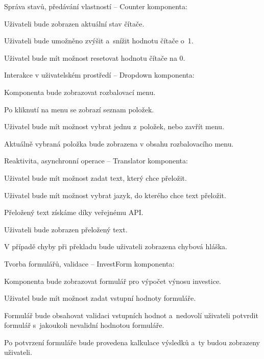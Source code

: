 \begin{citemize}
	\item Správa stavů, předávání vlastností -- Counter komponenta:
	
	\begin{cenumerate}
		\item Uživateli bude zobrazen aktuální stav čítače.
		\item Uživateli bude umožněno zvýšit a~snížit hodnotu čítače o~1.
		\item Uživatel bude mít možnost resetovat hodnotu čítače na 0.
	\end{cenumerate}

	\item Interakce v uživatelském prostředí -- Dropdown komponenta:
	
	\begin{cenumerate}
		\item Komponenta bude zobrazovat rozbalovací menu.
		\item Po kliknutí na menu se zobrazí seznam položek.
		\item Uživatel bude mít možnost vybrat jednu z~položek, nebo zavřít menu.
		\item Aktuálně vybraná položka bude zobrazena v obsahu rozbalovacího menu.
	\end{cenumerate}

	\item Reaktivita, asynchronní operace -- Translator komponenta:
	
	\begin{cenumerate}
		\item Uživatel bude mít možnost zadat text, který chce přeložit.
		\item Uživatel bude mít možnost vybrat jazyk, do kterého chce text přeložit.
		\item Přeložený text získáme díky veřejnému API.
		\item Uživateli bude zobrazen přeložený text.
		\item V případě chyby při překladu bude uživateli zobrazena chybová hláška.
	\end{cenumerate}

	\item Tvorba formulářů, validace -- InvestForm komponenta:
	
	\begin{cenumerate}
		\item Komponenta bude zobrazovat formulář pro výpočet výnosu investice.
		\item Uživatel bude mít možnost zadat vstupní hodnoty formuláře.
		\item Formulář bude obsahovat validaci vstupních hodnot a~nedovolí uživateli potvrdit formulář s~jakoukoli nevalidní hodnotou formuláře.
		\item Po potvrzení formuláře bude provedena kalkulace výsledků a~ty budou zobrazeny uživateli.
	\end{cenumerate}


\end{citemize}
